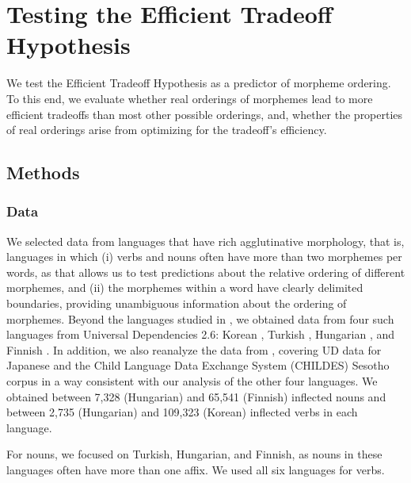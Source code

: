 \documentclass[man]{apa7}
\newcommand{\citep}{\parencite}
\newcommand{\citet}{\Textcite}
\begin{document}
\section{Testing the Efficient Tradeoff Hypothesis}\label{seq:testing}



We test the Efficient Tradeoff Hypothesis as a predictor of morpheme ordering.
To this end, we evaluate whether real orderings of morphemes lead to more efficient tradeoffs than most other possible orderings, and, whether the properties of real orderings arise from optimizing for the tradeoff's efficiency.

\subsection{Methods} 

\subsubsection{Data} 
We selected data from languages that have rich agglutinative morphology, that is, languages in which (i) verbs and nouns often have more than two morphemes per words, as that allows us to test predictions about the relative ordering of different morphemes, and (ii) the morphemes within a word have clearly delimited boundaries, providing unambiguous information about the ordering of morphemes.
Beyond the languages studied in \citet{Hahn2020modeling}, we obtained data from four such languages from Universal Dependencies \citep[UD][]{DBLP:conf/lrec/NivreMGHMPSTZ20} 2.6: Korean \citep{chun2018building}, Turkish \citep{turkish-imst}, Hungarian \citep{hungarian-szeged}, and Finnish \citep{UDFinnish-TDT,UDFinnish-FTB}.
In addition, we also reanalyze the data from \citet{Hahn2020modeling}, covering UD data for Japanese \citep{asahara2018universal} and the Child Language Data Exchange System (CHILDES) Sesotho corpus \citep{demuth1992acquisition} in a way consistent with our analysis of the other four languages.
We obtained between 7,328 (Hungarian) and 65,541 (Finnish) inflected nouns and between 2,735 (Hungarian) and 109,323 (Korean) inflected verbs in each language.






For nouns, we focused on Turkish, Hungarian, and Finnish, as nouns in these languages often have more than one affix.
We used all six languages for verbs.
\end{document}
